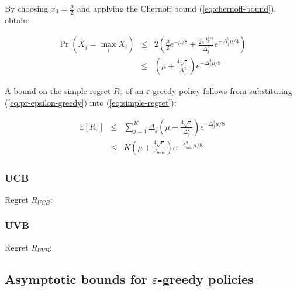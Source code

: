 \documentclass{article}
\newcommand {\IE} {\ensuremath {\mathbb{E}}}
\begin{document}
By choosing $x_0=\frac \mu 2$ and applying the Chernoff bound (\ref{eq:chernoff-bound}), obtain:

\begin{eqnarray}
\label{eq:pr-epsilon-greedy}
\Pr(\overline X_j=\max_i\overline X_i)&\le& 2\left(\frac {\mu}{2} e^{-\mu/8} + \frac {2e^{\Delta_j^2/2}}{\Delta_j^2}e^{-\Delta_j^2 \mu/4}\right)\nonumber\\
&\le&\left(\mu + \frac {4\sqrt e}{\Delta_j^2}\right)e^{-\Delta_j^2\mu/8}
\end{eqnarray}

A bound on the simple regret $R_\varepsilon$ of an
$\varepsilon$-greedy policy follows from substituting
(\ref{eq:pr-epsilon-greedy}) into (\ref{eq:simple-regret}):

\begin{eqnarray}
\IE[R_\varepsilon]&\le&\sum_{j=1}^K\Delta_j\left(\mu + \frac {4\sqrt e}
{\Delta_j^2}\right)e^{-\Delta_j^2\mu/8}\nonumber\\
&\le&K\left(\mu + \frac {4\sqrt e}{\Delta_{\min}}\right)e^{-\Delta_{\min}^2\mu/8}
\end{eqnarray}

\subsubsection{UCB}

Regret $R_{UCB}$:

\subsubsection{UVB}

Regret $R_{UVB}$:

\subsection{Asymptotic bounds for $\varepsilon$-greedy policies}
\end{document}
